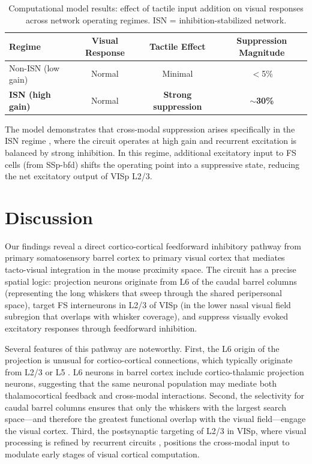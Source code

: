 \documentclass[11pt]{article}
\begin{document}
\begin{table}[H]
\centering
\caption{Computational model results: effect of tactile input addition on visual responses across network operating regimes. ISN = inhibition-stabilized network.}
\label{tab:model_results}
\begin{tabular}{lccc}
\toprule
\textbf{Regime} & \textbf{Visual Response} & \textbf{Tactile Effect} & \textbf{Suppression Magnitude} \\
\midrule
Non-ISN (low gain) & Normal & Minimal & $<$5\% \\
\textbf{ISN (high gain)} & Normal & \textbf{Strong suppression} & \textbf{$\sim$30\%} \\
\bottomrule
\end{tabular}
\end{table}

The model demonstrates that cross-modal suppression arises specifically in the ISN regime \citep{ozeki2009inhibitory, rubin2015stabilized, sanzeni2020inhibition}, where the circuit operates at high gain and recurrent excitation is balanced by strong inhibition. In this regime, additional excitatory input to FS cells (from SSp-bfd) shifts the operating point into a suppressive state, reducing the net excitatory output of VISp L2/3.

\section{Discussion}

Our findings reveal a direct cortico-cortical feedforward inhibitory pathway from primary somatosensory barrel cortex to primary visual cortex that mediates tacto-visual integration in the mouse proximity space. The circuit has a precise spatial logic: projection neurons originate from L6 of the caudal barrel columns (representing the long whiskers that sweep through the shared peripersonal space), target FS interneurons in L2/3 of VISp (in the lower nasal visual field subregion that overlaps with whisker coverage), and suppress visually evoked excitatory responses through feedforward inhibition.

Several features of this pathway are noteworthy. First, the L6 origin of the projection is unusual for cortico-cortical connections, which typically originate from L2/3 or L5 \citep{zingg2014neural, hooks2013organization}. L6 neurons in barrel cortex include cortico-thalamic projection neurons, suggesting that the same neuronal population may mediate both thalamocortical feedback and cross-modal interactions. Second, the selectivity for caudal barrel columns ensures that only the whiskers with the largest search space---and therefore the greatest functional overlap with the visual field---engage the visual cortex. Third, the postsynaptic targeting of L2/3 in VISp, where visual processing is refined by recurrent circuits \citep{reinhold2015distinct, adesnik2012lateral}, positions the cross-modal input to modulate early stages of visual cortical computation.
\end{document}
